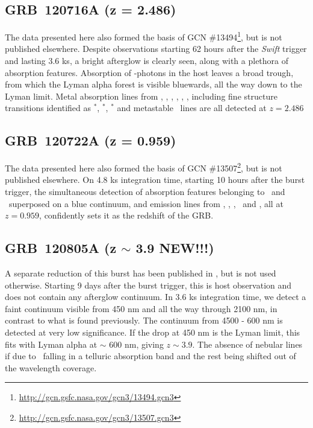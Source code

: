 \documentclass{aa}    %
\begin{document}
\subsection{GRB~120716A (z = 2.486)}
The data presented here also formed the basis of GCN \#13494\footnote{\url{http://gcn.gsfc.nasa.gov/gcn3/13494.gcn3}}, but is not
published elsewhere. Despite observations starting 62 hours after the
\textit{Swift} trigger and lasting 3.6 ks, a bright afterglow is clearly seen,
along with a plethora of absorption features. Absorption of \lya-photons in the
host leaves a broad trough, from which the Lyman alpha forest is visible
bluewards, all the way down to the Lyman limit. Metal absorption lines from
\cii, \SIii, \oi, \feii, \civ, \SIiv, including fine structure transitions
identified as \cii$^*$, \SIii$^*$, \feii$^*$ and metastable \NIii~lines are all
detected at $z = 2.486$


\subsection{GRB~120722A (z = 0.959)}
The data presented here also formed the basis of GCN \#13507\footnote{\url{http://gcn.gsfc.nasa.gov/gcn3/13507.gcn3}}, but is not
published elsewhere. On 4.8 ks integration time, starting 10 hours after the
burst trigger, the simultaneous detection of absorption features belonging to
\mgii~and \feii~superposed on a blue continuum, and emission lines from \oii,
\hg, \hb, \oiii~and \ha, all at $z = 0.959$, confidently sets it as the
redshift of the GRB.



\subsection{GRB~120805A (z $\sim$ 3.9 NEW!!!)}
A separate reduction of this burst has been published in \citet{Kruhler2015},
but is not used otherwise. Starting 9 days after the burst trigger, this is host
observation and does not contain any afterglow continuum. In 3.6 ks integration
time, we detect a faint continuum visible from 450 nm and all the way through
2100 nm, in contrast to what is found previously. The continuum from 4500 -
600 nm is detected at very low significance. If the drop at 450 nm is the
Lyman limit, this fits with Lyman alpha at $\sim$ 600 nm, giving $z \sim
3.9$. The absence of nebular lines if due to \oii~falling in a telluric
absorption band and the rest being shifted out of the wavelength coverage.
\end{document}

